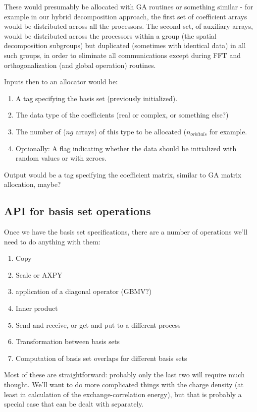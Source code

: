 These would presumably be allocated with GA routines or something
similar - for example in our hybrid decomposition approach, the first
set of coefficient arrays would be distributed across all the processors. The
second set, of auxiliary arrays, would be distributed across the processors
within a group (the spatial decomposition subgroups) but duplicated (sometimes
with identical data) in all such groups, in order to eliminate all
communications except during FFT and orthogonalization (and global operation)
routines.

Inputs then to an allocator would be:
\begin{enumerate}
\item A tag specifying the basis set (previously initialized).
\item The data type of the coefficients (real or complex, or something else?)
\item The number of ($ng$ arrays) of this type to be
allocated ($n_{orbitals}$ for example.
\item Optionally: A flag indicating whether the data should be
initialized with random values or with zeroes.
\end{enumerate}

Output would be a tag specifying the coefficient matrix, similar to
GA matrix allocation, maybe?

\subsection{API for basis set operations}

Once we have the basis set specifications, there are a number of
operations we'll need to do anything with them:
\begin{enumerate}
\item Copy
\item Scale or AXPY
\item application of a diagonal operator (GBMV?)
\item Inner product
\item Send and receive, or get and put to a different process
\item Transformation between basis sets
\item Computation of basis set overlaps for different basis sets
\end{enumerate}

Most of these are straightforward: probably only the last two
will require much thought. We'll want to do more complicated
things with the charge density (at least in calculation of
the exchange-correlation energy), but that is probably a special
case that can be dealt with separately.

